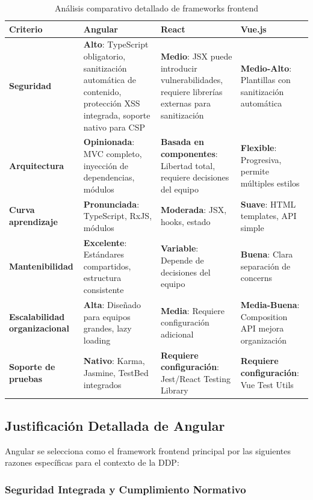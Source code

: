 \begin{table}[htbp]
\centering
\caption{Análisis comparativo detallado de frameworks frontend}
\label{tab:comparativa-frontend}
\small
\begin{tabular}{|p{2.3cm}|p{3.3cm}|p{3.3cm}|p{3.3cm}|}
\hline
\textbf{Criterio} & \textbf{Angular} & \textbf{React} & \textbf{Vue.js} \\
\hline
\textbf{Seguridad} & \textbf{Alto}: TypeScript obligatorio, sanitización automática de contenido, protección XSS integrada, soporte nativo para CSP & \textbf{Medio}: JSX puede introducir vulnerabilidades, requiere librerías externas para sanitización & \textbf{Medio-Alto}: Plantillas con sanitización automática \\
\hline
\textbf{Arquitectura} & \textbf{Opinionada}: MVC completo, inyección de dependencias, módulos & \textbf{Basada en componentes}: Libertad total, requiere decisiones del equipo & \textbf{Flexible}: Progresiva, permite múltiples estilos \\
\hline
\textbf{Curva aprendizaje} & \textbf{Pronunciada}: TypeScript, RxJS, módulos & \textbf{Moderada}: JSX, hooks, estado & \textbf{Suave}: HTML templates, API simple \\
\hline
\textbf{Mantenibilidad} & \textbf{Excelente}: Estándares compartidos, estructura consistente & \textbf{Variable}: Depende de decisiones del equipo & \textbf{Buena}: Clara separación de concerns \\
\hline
\textbf{Escalabilidad organizacional} & \textbf{Alta}: Diseñado para equipos grandes, lazy loading & \textbf{Media}: Requiere configuración adicional & \textbf{Media-Buena}: Composition API mejora organización \\
\hline
\textbf{Soporte de pruebas} & \textbf{Nativo}: Karma, Jasmine, TestBed integrados & \textbf{Requiere configuración}: Jest/React Testing Library & \textbf{Requiere configuración}: Vue Test Utils \\
\hline
\end{tabular}
\end{table}

\subsection{Justificación Detallada de Angular}

Angular se selecciona como el framework frontend principal por las siguientes razones específicas para el contexto de la DDP:

\subsubsection{Seguridad Integrada y Cumplimiento Normativo}

